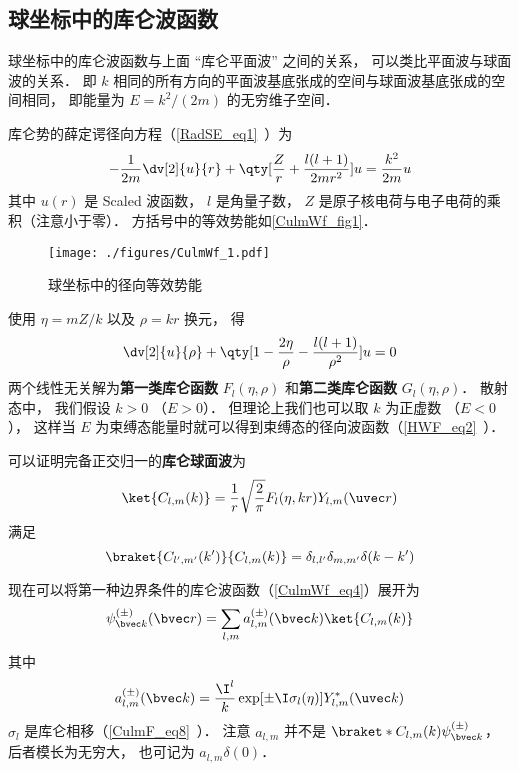 \subsection{球坐标中的库仑波函数}
球坐标中的库仑波函数与上面 “库仑平面波” 之间的关系， 可以类比平面波与球面波的关系． 即 $k$ 相同的所有方向的平面波基底张成的空间与球面波基底张成的空间相同， 即能量为 $E = k^2/(2m)$ 的无穷维子空间．

库仑势的薛定谔径向方程（\autoref{RadSE_eq1}~）为
\begin{equation}\label{CulmWf_eq5}
-\frac{1}{2m} \dv[2]{u}{r} + \qty[\frac{Z}{r} + \frac{l(l+1)}{2mr^2}]u = \frac{k^2}{2m}u
\end{equation}
其中 $u(r)$ 是 Scaled 波函数， $l$ 是角量子数， $Z$ 是原子核电荷与电子电荷的乘积（注意小于零）． 方括号中的等效势能如\autoref{CulmWf_fig1}．
\begin{figure}[ht]
\centering
\texttt{[image: ./figures/CulmWf\_1.pdf]}
\caption{球坐标中的径向等效势能} \label{CulmWf_fig1}
\end{figure}

使用 $\eta = mZ/k$ 以及 $\rho = kr$ 换元， 得
\begin{equation}
\dv[2]{u}{\rho} + \qty[1 - \frac{2\eta}{\rho} - \frac{l(l+1)}{\rho^2}]u = 0
\end{equation}
两个线性无关解为\textbf{第一类库仑函数} $F_l(\eta, \rho)$ 和\textbf{第二类库仑函数} $G_l(\eta, \rho)$． 散射态中， 我们假设 $k > 0$ （$E > 0$）． 但理论上我们也可以取 $k$ 为正虚数 （$E < 0$）， 这样当 $E$ 为束缚态能量时就可以得到束缚态的径向波函数（\autoref{HWF_eq2}~）．

可以证明完备正交归一的\textbf{库仑球面波}为
\begin{equation}\label{CulmWf_eq1}
\ket{C_{l,m}(k)} = \frac{1}{r} \sqrt{\frac{2}{\pi}} F_l(\eta, kr) Y_{l,m}(\uvec r)
\end{equation}
满足
\begin{equation}\label{CulmWf_eq2}
\braket{C_{l',m'}(k')}{C_{l,m}(k)} = \delta_{l,l'}\delta_{m,m'}\delta(k-k')
\end{equation}

现在可以将第一种边界条件的库仑波函数（\autoref{CulmWf_eq4}）展开为
\begin{equation}\label{CulmWf_eq9}
\psi_{\bvec k}^{(\pm)}(\bvec r) =  \sum_{l,m} a_{l,m}^{(\pm)}(\bvec k) \ket{C_{l,m}(k)}
\end{equation}
其中
\begin{equation}%
a_{l,m}^{(\pm)}(\bvec k) = \frac{\I^l}{k} \exp[\pm\I\sigma_l(\eta)] Y_{l,m}^* (\uvec k)
\end{equation}
$\sigma_l$ 是库仑相移（\autoref{CulmF_eq8}~）． 注意 $a_{l,m}$ 并不是 $\braket*{C_{l,m}(k)}{\psi_{\bvec k}^{(\pm)}}$， 后者模长为无穷大， 也可记为 $a_{l,m}\delta(0)$．

